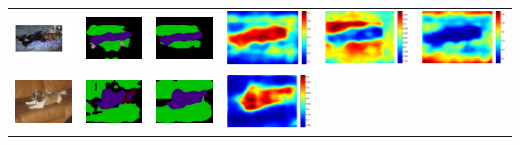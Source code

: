 \documentclass[landscape,final,a0paper,fontscale=0.285]{baposter}
\begin{document}
\begin{poster}
{{\begin{tabular}{c c c c c c}
   \includegraphics[height=0.09\linewidth]{fig/attention/voc12/img/2011_003256.jpg} &
      {\includegraphics[height=0.09\linewidth]{fig/attention/voc12/res_baseline/2011_003256.png}} &
      {\includegraphics[height=0.09\linewidth]{fig/attention/voc12/res_sharenet/2011_003256.png}} &
      {\includegraphics[height=0.09\linewidth]{fig/attention/voc12/att1/2011_003256.pdf}} &
      {\includegraphics[height=0.09\linewidth]{fig/attention/voc12/att2/2011_003256.pdf}} &
      {\includegraphics[height=0.09\linewidth]{fig/attention/voc12/att3/2011_003256.pdf}} \\
   \includegraphics[height=0.09\linewidth]{fig/attention/voc12/img/2007_008260.jpg} &
      {\includegraphics[height=0.09\linewidth]{fig/attention/voc12/res_baseline/2007_008260.png}} &
      {\includegraphics[height=0.09\linewidth]{fig/attention/voc12/res_sharenet/2007_008260.png}} &
      {\includegraphics[height=0.09\linewidth]{fig/attention/voc12/att1/2007_008260.pdf}} &

\end{tabular}}}
\end{poster}
\end{document}
